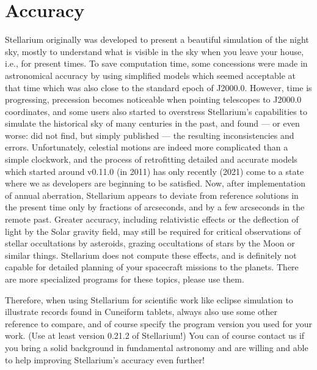 

\chapter{Accuracy}
\label{ch:Accuracy}

Stellarium originally was developed to present a beautiful simulation
of the night sky, mostly to understand what is visible in the sky when
you leave your house, i.e., for present times. To save computation
time, some concessions were made in astronomical accuracy by using
simplified models which seemed acceptable at that time which was also
close to the standard epoch of J2000.0. However, time is progressing,
precession becomes noticeable when pointing telescopes to J2000.0 coordinates, and some 
users also started to overstress Stellarium's capabilities to simulate the
historical sky of many centuries in the past, and found --- or even
worse: did not find, but simply published --- the resulting
inconsistencies and errors.  Unfortunately, celestial motions are
indeed more complicated than a simple clockwork, and the process of
retrofitting detailed and accurate models which started around v0.11.0
(in 2011) has only recently (2021)  come to a
state where we as developers are beginning to be satisfied. Now, after
implementation of annual aberration, Stellarium appears to deviate
from reference solutions in the present time only by fractions of
arcseconds, and by a few arcseconds in the remote past.  Greater
accuracy, including relativistic effects or the deflection of light by
the Solar gravity field, may still be required for critical
observations of stellar occultations by asteroids, grazing
occultations of stars by the Moon or similar things. Stellarium does
not compute these effects, and is definitely not capable for detailed
planning of your spacecraft missions to the planets.
There are more specialized programs for these topics, please use them.

Therefore, when using Stellarium for scientific work like eclipse
simulation to illustrate records found in Cuneiform tablets, always
also use some other reference to compare, and of course specify the
program version you used for your work. (Use at least version 0.21.2
of Stellarium!)  You can of course contact us if you bring a solid background
in fundamental astronomy and are willing and able to help improving
Stellarium's accuracy even further!

